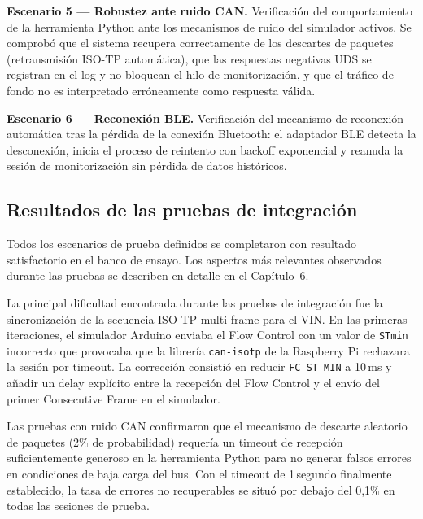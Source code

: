 \textbf{Escenario 5 — Robustez ante ruido CAN.} Verificación del comportamiento de la herramienta Python ante los mecanismos de ruido del simulador activos. Se comprobó que el sistema recupera correctamente de los descartes de paquetes (retransmisión ISO-TP automática), que las respuestas negativas UDS se registran en el log y no bloquean el hilo de monitorización, y que el tráfico de fondo no es interpretado erróneamente como respuesta válida.

\textbf{Escenario 6 — Reconexión BLE.} Verificación del mecanismo de reconexión automática tras la pérdida de la conexión Bluetooth: el adaptador BLE detecta la desconexión, inicia el proceso de reintento con backoff exponencial y reanuda la sesión de monitorización sin pérdida de datos históricos.


\subsection{Resultados de las pruebas de integración}

Todos los escenarios de prueba definidos se completaron con resultado satisfactorio en el banco de ensayo. Los aspectos más relevantes observados durante las pruebas se describen en detalle en el Capítulo~6.

La principal dificultad encontrada durante las pruebas de integración fue la sincronización de la secuencia ISO-TP multi-frame para el VIN. En las primeras iteraciones, el simulador Arduino enviaba el Flow Control con un valor de \texttt{STmin} incorrecto que provocaba que la librería \texttt{can-isotp} de la Raspberry Pi rechazara la sesión por timeout. La corrección consistió en reducir \texttt{FC\_ST\_MIN} a 10\,ms y añadir un delay explícito entre la recepción del Flow Control y el envío del primer Consecutive Frame en el simulador.

Las pruebas con ruido CAN confirmaron que el mecanismo de descarte aleatorio de paquetes (2\% de probabilidad) requería un timeout de recepción suficientemente generoso en la herramienta Python para no generar falsos errores en condiciones de baja carga del bus. Con el timeout de 1\,segundo finalmente establecido, la tasa de errores no recuperables se situó por debajo del 0,1\% en todas las sesiones de prueba.
